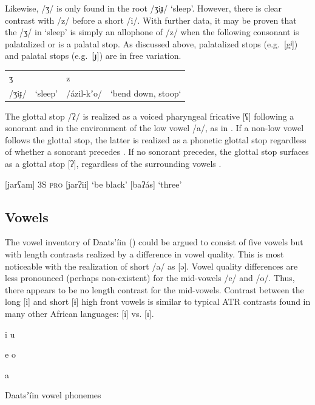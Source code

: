 \documentclass[output=paper]{langsci/langscibook}
\begin{document}
Likewise, /ʒ/ is only found in the root /ʒiɟ/ ‘sleep’. However, there is clear contrast with /z/ before a short /i/. With further data, it may be proven that the /ʒ/ in ‘sleep’ is simply an allophone of /z/ when the following consonant is palatalized or is a palatal stop. As discussed above, palatalized stops (e.g.\ [gʲ]) and palatal stops (e.g.\ [ɟ]) are in free variation. 

\begin{tabular}{llll}
ʒ  & &   z & \\
/ʒiɟ/ &  ‘sleep’  &  /\'{a}zil-kʼo/ & ‘bend down, stoop‘\\
\end{tabular}

The glottal stop /ʔ/ is realized as a voiced pharyngeal fricative [ʕ] following a sonorant and in the environment of the low vowel /a/, as in . If a non-low vowel follows the glottal stop, the latter is realized as a phonetic glottal stop regardless of whether a sonorant precedes . If no sonorant precedes, the glottal stop surfaces as a glottal stop [ʔ], regardless of the surrounding vowels .

\ea\label{ex:ahlandc:3}
\ea\label{ex:ahlandc:3a} [jarʕam] \textsc{3S pro} 
\ex\label{ex:ahlandc:3b} [jarʔii] ‘be black’
\ex\label{ex:ahlandc:3c} [baʔ\'{a}s] ‘three’
\z
\z


\subsection{Vowels}\label{sec:ahlandc:3.2}

The vowel inventory of Daats’\'iin () could be argued to consist of five vowels but with length contrasts realized by a difference in vowel quality. This is most noticeable with the realization of short /a/ as [ə]. Vowel quality differences are less pronounced (perhaps non-existent) for the mid-vowels /e/ and /o/. Thus, there appears to be no length contrast for the mid-vowels. Contrast between the long [i] and short [ɨ] high front vowels is similar to typical ATR contrasts found in many other African languages: [i] vs. [ɪ].


\begin{table}

i      u

      e      o

    a
\caption{Daatsʼ\'{i}in vowel phonemes}
\label{tab:ahlandc:2}
\end{table}
\end{document}
